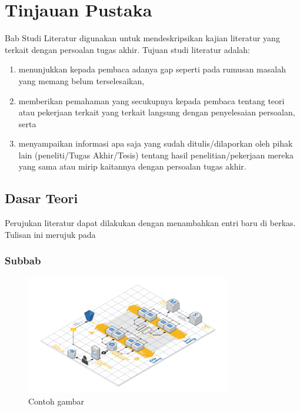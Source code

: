 \chapter{Tinjauan Pustaka}

Bab Studi Literatur digunakan untuk mendeskripsikan kajian literatur yang terkait dengan persoalan tugas akhir. Tujuan studi literatur adalah:

\begin{enumerate}
    \item menunjukkan kepada pembaca adanya gap seperti pada rumusan masalah yang memang belum terselesaikan,
    \item memberikan pemahaman yang secukupnya kepada pembaca tentang teori atau pekerjaan terkait yang terkait langsung dengan penyelesaian persoalan, serta
    \item menyampaikan informasi apa saja yang sudah ditulis/dilaporkan oleh pihak lain (peneliti/Tugas Akhir/Tesis) tentang hasil penelitian/pekerjaan mereka yang sama atau mirip kaitannya dengan persoalan tugas akhir.
\end{enumerate}

\blindtext

\section{Dasar Teori}
Perujukan literatur dapat dilakukan dengan menambahkan entri baru di berkas. Tulisan ini merujuk pada \cite{knuth2001art}

    \subsection{Subbab}

    \blindtext

    \begin{figure}[h]
        \centering
        \includegraphics[width=0.8\textwidth]{resources/chapter-2-infrastructure-diagram.png}
        \caption{Contoh gambar}
        \label{fig:1}
    \end{figure}

